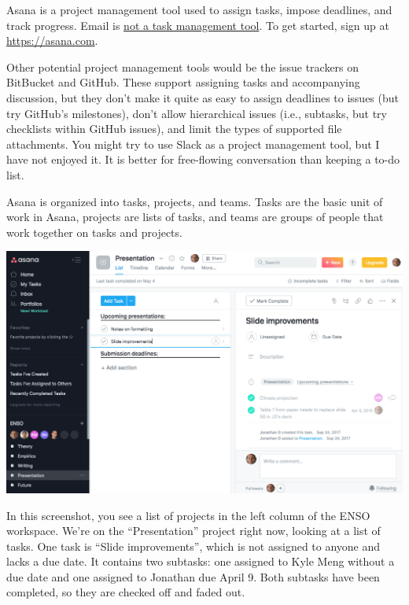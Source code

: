 Asana is a project management tool used to assign tasks, impose deadlines, and track progress.
Email is \href{https://facilethings.com/blog/en/your-email-is-not-a-todo-list}{not a task management tool}.
To get started, sign up at \url{https://asana.com}.

Other potential project management tools would be the issue trackers on BitBucket and GitHub.
These support assigning tasks and accompanying discussion,
but they don't make it quite as easy to assign deadlines to issues (but try GitHub's milestones), don't allow hierarchical issues (i.e., subtasks, but try checklists within GitHub issues), and limit the types of supported file attachments.
You might try to use Slack as a project management tool, but I have not enjoyed it.
It is better for free-flowing conversation than keeping a to-do list.

Asana is organized into tasks, projects, and teams.
Tasks are the basic unit of work in Asana,
projects are lists of tasks, and
teams are groups of people that work together on tasks and projects.

\begin{center}
\includegraphics[width=\textwidth]{./figures/workflow/asana_screenshot1.png}
\end{center}

In this screenshot,
you see a list of projects in the left column of the ENSO workspace.
We're on the ``Presentation'' project right now, looking at a list of tasks.
One task is ``Slide improvements'', which is not assigned to anyone and lacks a due date.
It contains two subtasks:
one assigned to Kyle Meng without a due date
and
one assigned to Jonathan due April 9.
Both subtasks have been completed, so they are checked off and faded out.

